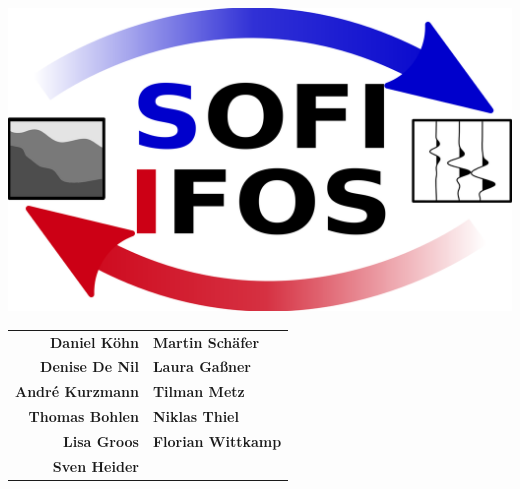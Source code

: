 \begin{center}
\includegraphics[width=.7\textwidth]{figures/logo_IFOS.png}

\vspace{0.2\textwidth}

\begin{tabular}{rl}
\textbf{Daniel K\"ohn} & \textbf{Martin Sch\"afer}\\
\textbf{Denise De Nil} & \textbf{Laura Ga\ss ner}\\
\textbf{Andr\'{e} Kurzmann} & \textbf{Tilman Metz}\\
\textbf{Thomas Bohlen} & \textbf{Niklas Thiel}\\
\textbf{Lisa Groos} & \textbf{Florian Wittkamp}\\
\textbf{Sven Heider} & \\
\end{tabular}

\end{center}
\rmfamily